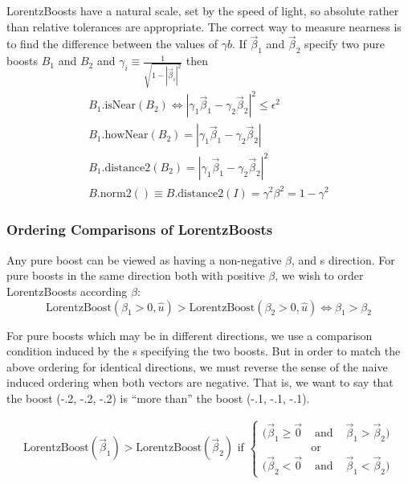 LorentzBoosts have a natural scale, set by the speed of light, so absolute
rather than relative tolerances are appropriate.
The correct way to measure nearness is to find the difference between the
values of $\gamma b$.  If $\vec{\beta}_1$ and 
$\vec{\beta}_2$ specify two pure boosts
$B_1$ and $B_2$
and $\gamma_i \equiv \frac{1}{\sqrt{1 - |\vec{\beta}_i|^2}}$ then
\begin{eqnarray}
\label{eq:nearboost}
    B_1 \mbox{.isNear} (B_2) \Longleftrightarrow
	\left| \gamma_1 \vec{\beta}_1 - \gamma_2 \vec{\beta}_2 \right|^2 \leq
	\epsilon^2
	\\
\label{eq:hownearboost}
    B_1 \mbox{.howNear} (B_2) =
	\left| \gamma_1 \vec{\beta}_1 - \gamma_2 \vec{\beta}_2 \right|
	\\
    B_1 \mbox{.distance2} (B_2) =
	\left| \gamma_1 \vec{\beta}_1 - \gamma_2 \vec{\beta}_2 \right|^2
	\\
\label{eq:boostnorm2}
    B\mbox{.norm2}( ) \equiv B\mbox{.distance2} (I) 
					= \gamma^2 \beta^2 = 1 - \gamma^2 
\end{eqnarray}

\subsubsection{Ordering Comparisons of LorentzBoosts}

Any pure boost can be viewed as having a non-negative $\beta$, and s
direction.
For pure boosts in the same direction both with positive $\beta$,
we wish to order LorentzBoosts according $\beta$:
\begin{equation}
\label{ordboost}
  \mbox{LorentzBoost}( \beta_1 > 0, \hat{u} ) >
  \mbox{LorentzBoost}( \beta_2 > 0, \hat{u} ) \Longleftrightarrow
  \beta_1 > \beta_2
\end{equation}

For pure boosts which may be in different directions,
we use a comparison
condition induced by the \SV s specifying the two boosts.
But in order to match the above ordering for identical directions, we must
reverse the sense of the naive induced ordering when both vectors are
negative.  That is, we want to say that the boost (-.2, -.2, -.2) is
``more than'' the boost (-.1, -.1, -.1).

\begin{eqnarray}
  \mbox{LorentzBoost}( \vec{\beta}_1 ) > \mbox{LorentzBoost}( \vec{\beta}_2 )
	\mbox{ if }
\left\{
  \begin{array}{ccc}
  ( \vec{\beta}_1 \geq \vec{0} & \mbox{ and } &
  \vec{\beta}_1 > \vec{\beta}_2 ) \\
	& \mbox{or} \\
  ( \vec{\beta}_2 < \vec{0} & \mbox{ and } &
  \vec{\beta}_1 < \vec{\beta}_2 )
  \end{array}
\right.
\end{eqnarray}


